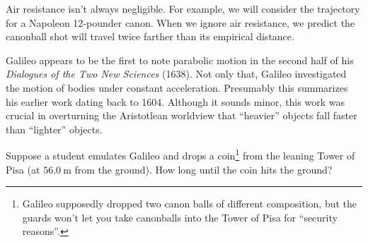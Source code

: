 \begin{remark}[Assumptions]
Air resistance isn't always negligible. For example, we will consider
the trajectory for a Napoleon 12-pounder canon. When we ignore air
resistance, we predict the canonball shot will travel twice farther
than its empirical distance.
\end{remark}

\begin{remark}
Galileo appears to be the first to note parabolic motion in the second
half of his \emph{Dialogues of the Two New Sciences} (1638). Not only
that, Galileo investigated the motion of bodies under constant
acceleration. Presumably this summarizes his earlier work dating back to
1604. Although it sounds minor, this work was crucial in overturning the
Aristotlean worldview that ``heavier'' objects fall faster than
``lighter'' objects. 
\end{remark}

\workedExamples{}

Suppose a student emulates Galileo and drops a coin\footnote{Galileo
  supposedly dropped two canon balls of different composition, but
  the guards won't let you take canonballs into the Tower of Pisa for
  ``security reasons''.} from the
leaning Tower of Pisa (at $\SI{56.0}{\meter}$ from the ground). How
long until the coin hits the ground? 

